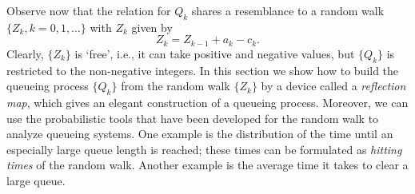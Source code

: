 Observe now that the relation for $Q_k$ shares a resemblance to a random walk $\{Z_k, k=0,1,\ldots\}$ with  $Z_k$ 
given by
\begin{equation}\label{eq:44}
  Z_k = Z_{k-1} + a_k - c_k.
\end{equation}
Clearly, $\{Z_k\}$ is `free', i.e., it can take positive and negative
values, but $\{Q_k\}$ is restricted to the non-negative integers.  In
this section we show how to build the queueing process $\{Q_k\}$ from
the random walk $\{Z_k\}$ by a device called a \emph{reflection map}, which gives an  elegant construction of a queueing process. Moreover, we can use the probabilistic
tools that have been developed for the random walk to analyze queueing
systems. One example is the distribution of the time until an
especially large queue length is reached; these times can be
formulated as \emph{hitting times} of the random walk. Another example
is the average time it takes to clear a large queue.

